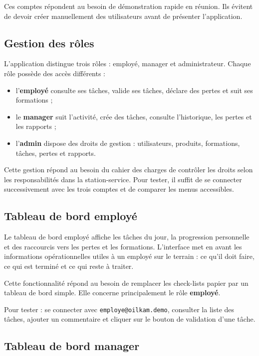 \documentclass[11pt,a4paper]{article}
\newcommand{\role}[1]{\textbf{\color{oilgreen}#1}}
\newcommand{\code}[1]{\texttt{#1}}
\begin{document}
Ces comptes répondent au besoin de démonstration rapide en réunion. Ils évitent de devoir créer manuellement des utilisateurs avant de présenter l'application.

\subsection{Gestion des rôles}

L'application distingue trois rôles : employé, manager et administrateur. Chaque rôle possède des accès différents :

\begin{itemize}
  \item l'\role{employé} consulte ses tâches, valide ses tâches, déclare des pertes et suit ses formations ;
  \item le \role{manager} suit l'activité, crée des tâches, consulte l'historique, les pertes et les rapports ;
  \item l'\role{admin} dispose des droits de gestion : utilisateurs, produits, formations, tâches, pertes et rapports.
\end{itemize}

Cette gestion répond au besoin du cahier des charges de contrôler les droits selon les responsabilités dans la station-service. Pour tester, il suffit de se connecter successivement avec les trois comptes et de comparer les menus accessibles.

\subsection{Tableau de bord employé}

Le tableau de bord employé affiche les tâches du jour, la progression personnelle et des raccourcis vers les pertes et les formations. L'interface met en avant les informations opérationnelles utiles à un employé sur le terrain : ce qu'il doit faire, ce qui est terminé et ce qui reste à traiter.

Cette fonctionnalité répond au besoin de remplacer les check-lists papier par un tableau de bord simple. Elle concerne principalement le rôle \role{employé}.

Pour tester : se connecter avec \code{employe@oilkam.demo}, consulter la liste des tâches, ajouter un commentaire et cliquer sur le bouton de validation d'une tâche.

\subsection{Tableau de bord manager}
\end{document}
